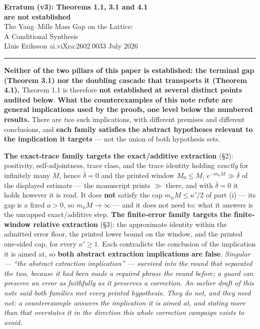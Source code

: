 \documentclass[11pt]{article}
\begin{document}
\begin{center}
{\Large\bfseries Erratum (v3): Theorems 1.1, 3.1 and 4.1\\
are not established}\\[5pt]
{\large The Yang--Mills Mass Gap on the Lattice:\\
A Conditional Synthesis}\\[6pt]
Lluis Eriksson \quad\textbullet\quad ai.viXra:2602.0033 \quad\textbullet\quad July 2026
\end{center}

\noindent\rule{\textwidth}{0.8pt}

\vspace{2pt}
\noindent
\textbf{Neither of the two pillars of this paper is established: the terminal gap
(Theorem 3.1) nor the doubling cascade that transports it (Theorem 4.1).} Theorem 1.1
is therefore \textbf{not established at several distinct points audited below}.
\textbf{What the counterexamples of this note refute are general implications used
by the proofs, one level below the numbered results.} There are \emph{two} such
implications, with different premises and different conclusions, and
\textbf{each family satisfies the abstract hypotheses relevant to the implication it
targets} --- not the union of both hypothesis sets.

\textbf{The exact-trace family targets the exact/additive extraction} (\S2):
positivity, self-adjointness, trace class, and the trace identity holding
\emph{exactly} for infinitely many $M$, hence $\bar\delta=0$ and the printed window
$M_0\le M$, $e^{-m_nM}\gg\bar\delta$ of the displayed estimate --- the manuscript
prints $\gg$ there, and with $\bar\delta=0$ it holds however it is read. It does \textbf{not}
satisfy the cap $m_nM\le\kappa'/2$ of part (i) --- its gap is a fixed $a>0$, so
$m_nM\to\infty$ --- and it does not need to: what it answers is the uncapped
exact/additive step.
\textbf{The finite-error family targets the \mbox{finite-window} relative extraction} (\S3):
the approximate identity within the admitted error floor, the printed lower bound on
the window, and the printed one-sided cap, for every $\kappa'\ge1$. Each contradicts
the conclusion of the implication it is aimed at, so \textbf{both abstract extraction
implications are false}. \emph{Singular --- ``the abstract extraction implication'' ---
survived into the round that separated the two, because it had been made a required
phrase the round before; a guard can preserve an error as faithfully as it preserves a
correction.} \emph{An earlier draft of this note said both
families met every printed hypothesis. They do not, and they need not: a
counterexample answers the implication it is aimed at, and stating more than that
overstates it in the direction this whole correction campaign exists to avoid.}
\end{document}
